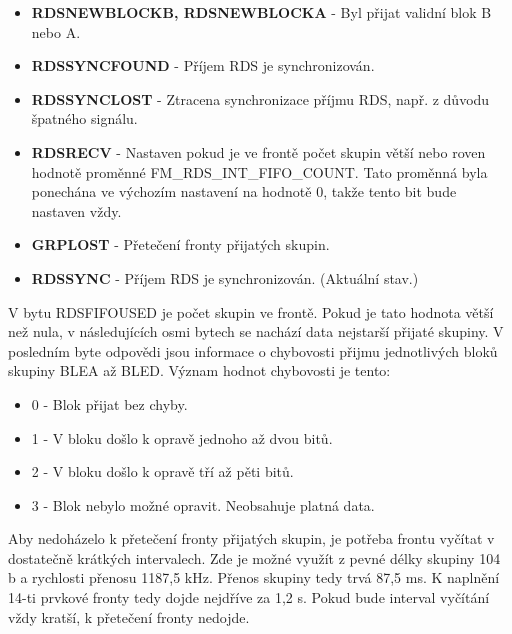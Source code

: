 \begin{itemize}
\item \textbf{RDSNEWBLOCKB, RDSNEWBLOCKA} - Byl přijat validní blok B nebo A.
\item \textbf{RDSSYNCFOUND} - Příjem RDS je synchronizován.
\item \textbf{RDSSYNCLOST} - Ztracena synchronizace příjmu RDS, např. z důvodu špatného signálu.
\item \textbf{RDSRECV} - Nastaven pokud je ve frontě počet skupin větší nebo roven hodnotě proměnné FM\_RDS\_INT\_FIFO\_COUNT. Tato proměnná byla ponechána ve výchozím nastavení na hodnotě 0, takže tento bit bude nastaven vždy.
\item \textbf{GRPLOST} - Přetečení fronty přijatých skupin.
\item \textbf{RDSSYNC} - Příjem RDS je synchronizován. (Aktuální stav.)
\end{itemize}

V bytu RDSFIFOUSED je počet skupin ve frontě. Pokud je tato hodnota větší než nula, v následujících osmi bytech se nachází data nejstarší přijaté skupiny. V posledním byte odpovědi jsou informace o chybovosti přijmu jednotlivých bloků skupiny BLEA až BLED. Význam hodnot chybovosti je tento:

\begin{itemize}
\item 0 - Blok přijat bez chyby.
\item 1 - V bloku došlo k opravě jednoho až dvou bitů. 
\item 2 - V bloku došlo k opravě tří až pěti bitů.
\item 3 - Blok nebylo možné opravit. Neobsahuje platná data.
\end{itemize} 

Aby nedoházelo k přetečení fronty přijatých skupin, je potřeba frontu vyčítat v dostatečně krátkých intervalech. Zde je možné využít z pevné délky skupiny 104 b a rychlosti přenosu 1187,5 kHz. Přenos skupiny tedy trvá 87,5 ms. K naplnění 14-ti prvkové fronty tedy dojde nejdříve za 1,2 s. Pokud bude interval vyčítání vždy kratší, k přetečení fronty nedojde.
